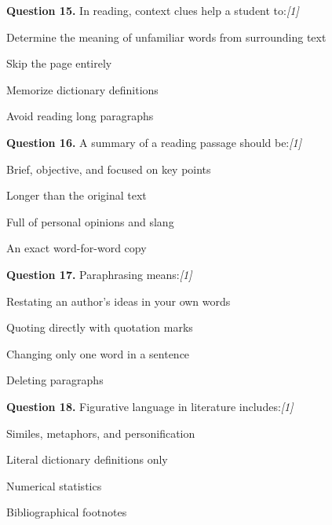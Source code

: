 \documentclass[11pt,a4paper]{article}
\newcommand{\pts}[1]{\hfill   \textit{[#1]}}
\begin{document}
\medskip




\noindent   \textbf{Question 15.} In reading, context clues help a student to:\pts{1}

\begin{parts}
  \item Determine the meaning of unfamiliar words from surrounding text
  \item Skip the page entirely
  \item Memorize dictionary definitions
  \item Avoid reading long paragraphs
\end{parts}

\medskip




\noindent   \textbf{Question 16.} A summary of a reading passage should be:\pts{1}

\begin{parts}
  \item Brief, objective, and focused on key points
  \item Longer than the original text
  \item Full of personal opinions and slang
  \item An exact word-for-word copy
\end{parts}

\medskip




\noindent   \textbf{Question 17.} Paraphrasing means:\pts{1}

\begin{parts}
  \item Restating an author's ideas in your own words
  \item Quoting directly with quotation marks
  \item Changing only one word in a sentence
  \item Deleting paragraphs
\end{parts}

\medskip




\noindent   \textbf{Question 18.} Figurative language in literature includes:\pts{1}

\begin{parts}
  \item Similes, metaphors, and personification
  \item Literal dictionary definitions only
  \item Numerical statistics
  \item Bibliographical footnotes
\end{parts}
\end{document}
